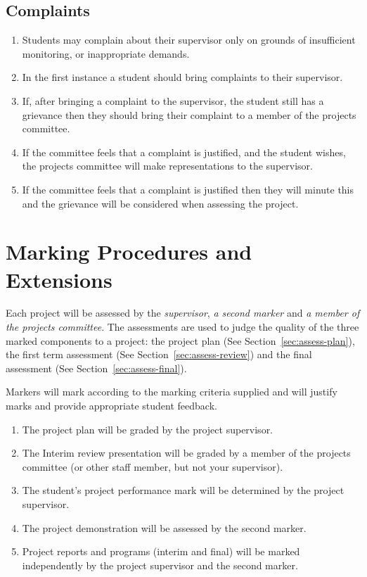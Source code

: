 \documentclass[11pt]{article}
\begin{document}
\subsection*{Complaints}
\begin{enumerate}
\item Students may complain about their supervisor only on grounds of insufficient monitoring, or inappropriate demands.
\item In the first instance a student should bring complaints to their supervisor.
\item If, after bringing a complaint to the supervisor, the student still has a grievance then they should bring their complaint to a member of the projects committee.
\item If the committee feels that a complaint is justified, and the student wishes, the projects committee will make representations to the supervisor.
\item If the committee feels that a complaint is justified then they will minute this and the grievance will be considered when assessing the project.
\end{enumerate}

\newpage

\section{Marking Procedures and Extensions}
Each project will be assessed by the \emph{supervisor}, \emph{a second marker} and \emph{a member of the projects committee}.
The assessments are used to judge the quality of the three marked components to a project:  the project plan (See Section~\ref{sec:assess-plan}), the first term assessment (See Section~\ref{sec:assess-review})  and the final assessment (See Section~\ref{sec:assess-final}).

Markers will mark according to the marking criteria supplied and will justify marks and provide appropriate student feedback.
\begin{enumerate}
\item The project plan will be graded by the project supervisor.
\item The Interim review presentation will be graded by a member of the projects committee (or other staff member, but not your supervisor).
\item The student's project performance mark will be determined by the project supervisor.
\item The project demonstration will be assessed by the second marker.
\item Project reports and programs (interim and final) will be marked independently by the project supervisor and the second marker.
\end{enumerate}
\end{document}
